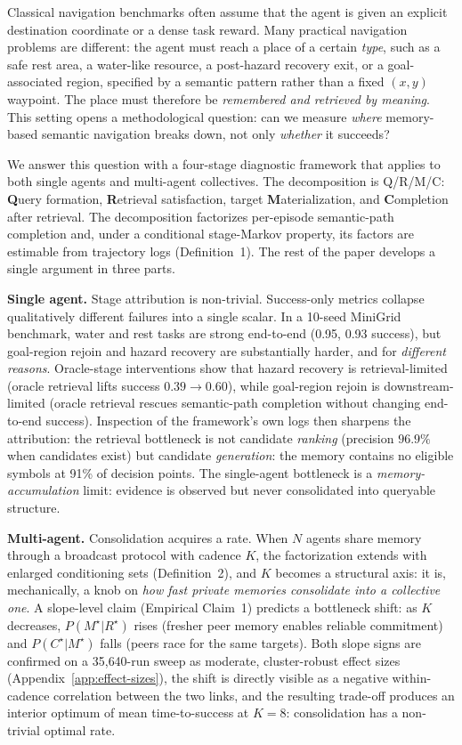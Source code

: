 \documentclass{article}
\begin{document}
Classical navigation benchmarks often assume that the agent is given an
explicit destination coordinate or a dense task reward. Many practical
navigation problems are different: the agent must reach a place of a
certain \emph{type}, such as a safe rest area, a water-like resource, a
post-hazard recovery exit, or a goal-associated region, specified by
a semantic pattern rather than a fixed $(x, y)$ waypoint. The place
must therefore be \emph{remembered and retrieved by meaning}. This
setting opens a methodological question: can we measure \emph{where}
memory-based semantic navigation breaks down, not only \emph{whether}
it succeeds?

We answer this question with a four-stage diagnostic framework that
applies to both single agents and multi-agent collectives. The
decomposition is Q/R/M/C: \textbf{Q}uery formation, \textbf{R}etrieval
satisfaction, target \textbf{M}aterialization, and \textbf{C}ompletion
after retrieval. The decomposition factorizes per-episode semantic-path
completion and, under a conditional stage-Markov property, its factors
are estimable from trajectory logs (Definition~1).
The rest of the paper develops a single argument in three parts.

\textbf{Single agent.} Stage attribution is non-trivial.
Success-only metrics collapse qualitatively different failures into a
single scalar. In a 10-seed MiniGrid benchmark, water and rest tasks
are strong end-to-end (0.95, 0.93 success), but goal-region rejoin and
hazard recovery are substantially harder, and for \emph{different
reasons}. Oracle-stage interventions show that hazard recovery is
retrieval-limited (oracle retrieval lifts success $0.39 \to 0.60$),
while goal-region rejoin is downstream-limited (oracle retrieval
rescues semantic-path completion without changing end-to-end success).
Inspection of the framework's own logs then sharpens the attribution:
the retrieval bottleneck is not candidate \emph{ranking} (precision
$96.9\%$ when candidates exist) but candidate \emph{generation}: the
memory contains no eligible symbols at 91\% of decision points.
The single-agent bottleneck is a \emph{memory-accumulation} limit:
evidence is observed but never consolidated into queryable structure.

\textbf{Multi-agent.} Consolidation acquires a rate.
When $N$ agents share memory through a broadcast protocol with cadence
$K$, the factorization extends with enlarged conditioning sets
(Definition~2), and $K$ becomes a structural axis: it
is, mechanically, a knob on \emph{how fast private memories consolidate
into a collective one}. A slope-level claim
(Empirical Claim~1) predicts a bottleneck shift: as $K$
decreases, $P(M^\star|R^\star)$ rises (fresher peer memory enables
reliable commitment) and $P(C^\star|M^\star)$ falls (peers race for
the same targets). Both slope signs are confirmed on a 35{,}640-run
sweep as moderate, cluster-robust effect sizes (Appendix~\ref{app:effect-sizes}), the shift is directly visible as a negative
within-cadence correlation between the two links, and the resulting
trade-off produces an interior optimum of mean time-to-success at
$K\!=\!8$: consolidation has a non-trivial optimal rate.
\end{document}
